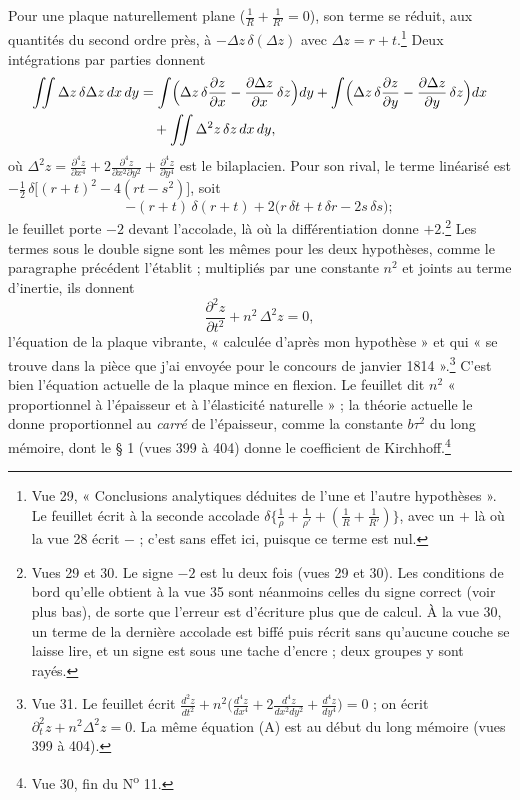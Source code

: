 \documentclass[11pt,a4paper]{article}
\begin{document}
Pour une plaque naturellement plane ($\frac1R + \frac1{R'} = 0$), son terme se
réduit, aux quantités du second ordre près, à $-\Delta z\,\delta(\Delta z)$
avec $\Delta z = r + t$.\footnote{Vue 29, « Conclusions analytiques déduites de
l'une et l'autre hypothèses ». Le feuillet écrit à la seconde accolade
$\delta\{\frac1\rho + \frac1{\rho'} + (\frac1R + \frac1{R'})\}$, avec un $+$ là où
la vue 28 écrit $-$ ; c'est sans effet ici, puisque ce terme est nul.} Deux
intégrations par parties donnent
\begin{align*}
\iint \Delta z\,\delta\Delta z\,dx\,dy
&= \int\Bigl(\Delta z\,\delta\frac{\partial z}{\partial x} - \frac{\partial \Delta
z}{\partial x}\,\delta z\Bigr)dy
 + \int\Bigl(\Delta z\,\delta\frac{\partial z}{\partial y} - \frac{\partial \Delta
z}{\partial y}\,\delta z\Bigr)dx \\
&\quad + \iint \Delta^2 z\,\delta z\,dx\,dy ,
\end{align*}
où $\Delta^2 z = \frac{\partial^4 z}{\partial x^4} + 2\frac{\partial^4
z}{\partial x^2\partial y^2} + \frac{\partial^4 z}{\partial y^4}$ est le
bilaplacien. Pour son rival, le terme linéarisé est
$-\frac12\,\delta\bigl[(r+t)^2 - 4(rt-s^2)\bigr]$, soit
\[
-(r+t)\,\delta(r+t) + 2\bigl(r\,\delta t + t\,\delta r - 2s\,\delta s\bigr) ;
\]
le feuillet porte $-2$ devant l'accolade, là où la différentiation donne
$+2$.\footnote{Vues 29 et 30. Le signe $-2$ est lu deux fois (vues 29 et 30).
Les conditions de bord qu'elle obtient à la vue 35 sont néanmoins celles du
signe correct (voir plus bas), de sorte que l'erreur est d'écriture plus que de
calcul. À la vue 30, un terme de la dernière accolade est biffé puis récrit
sans qu'aucune couche se laisse lire, et un signe est sous une tache d'encre ;
deux groupes y sont rayés.} Les termes sous le double signe sont les mêmes pour
les deux hypothèses, comme le paragraphe précédent l'établit ; multipliés par
une constante $n^2$ et joints au terme d'inertie, ils donnent
\[
\frac{\partial^2 z}{\partial t^2} + n^2\,\Delta^2 z = 0 ,
\]
l'équation de la plaque vibrante, « calculée d'après mon hypothèse » et qui « se
trouve dans la pièce que j'ai envoyée pour le concours de janvier
1814 ».\footnote{Vue 31. Le feuillet écrit $\frac{d^2z}{dt^2} +
n^2\bigl(\frac{d^4z}{dx^4} + 2\frac{d^4z}{dx^2dy^2} + \frac{d^4z}{dy^4}\bigr)
= 0$ ; on écrit $\partial_t^2 z + n^2\Delta^2 z = 0$. La même équation (A) est
au début du long mémoire (vues 399 à 404).} C'est bien l'équation actuelle de la
plaque mince en flexion. Le feuillet dit $n^2$ « proportionnel à l'épaisseur et
à l'élasticité naturelle » ; la théorie actuelle le donne proportionnel au \emph{carré} de l'épaisseur,
comme la constante $b\tau^2$ du long mémoire, dont le § 1 (vues 399 à 404) donne
le coefficient de Kirchhoff.\footnote{Vue 30, fin du N\textsuperscript{o} 11.}
\end{document}
